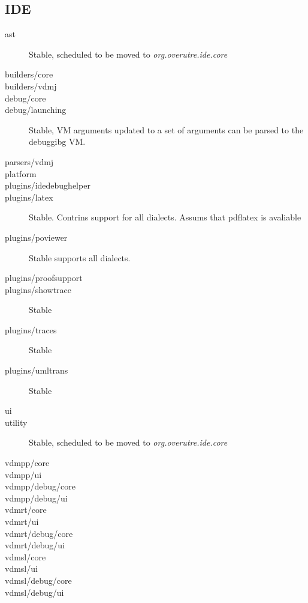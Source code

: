 \subsection{IDE}
\begin{description}
\item[ast] Stable, scheduled to be moved to \textit{org.overutre.ide.core}
\item[builders/core]
\item[builders/vdmj]
\item[debug/core]
\item[debug/launching] Stable, VM arguments updated to a set of arguments can be parsed to the debuggibg VM.

\item[parsers/vdmj]
\item[platform]


\item[plugins/idedebughelper]
\item[plugins/latex] Stable. Contrins support for all dialects. Assums that pdflatex is avaliable

\item[plugins/poviewer] Stable supports all dialects.
\item[plugins/proofsupport]
\item[plugins/showtrace] Stable
\item[plugins/traces] Stable
\item[plugins/umltrans] Stable

\item[ui]
\item[utility]Stable, scheduled to be moved to \textit{org.overutre.ide.core}
\item[vdmpp/core]
\item[vdmpp/ui]
\item[vdmpp/debug/core]
\item[vdmpp/debug/ui]

\item[vdmrt/core]
\item[vdmrt/ui]
\item[vdmrt/debug/core]
\item[vdmrt/debug/ui]

\item[vdmsl/core]
\item[vdmsl/ui]
\item[vdmsl/debug/core]
\item[vdmsl/debug/ui]

\end{description}

